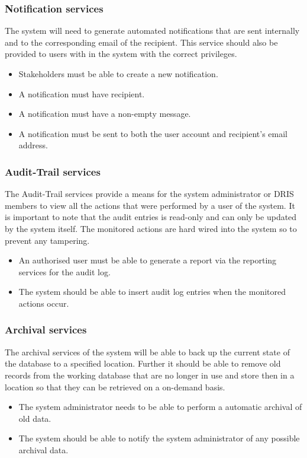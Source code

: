 \documentclass[12pt]{article}
\begin{document}
\subsubsection{Notification services}
The system will need to generate automated notifications that are sent internally and to the corresponding email of the recipient. This service should also be provided to users with in the system with the correct privileges.
\begin{itemize}
	\item Stakeholders must be able to create a new notification.
	\item A notification must have recipient.
	\item A notification must have a non-empty message.
	\item A notification must be sent to both the user account and recipient's email address.
\end{itemize}

\subsubsection{Audit-Trail services}
The Audit-Trail services provide a means for the system administrator or DRIS members to view all the actions that were performed by a user of the system. It is important to note that the audit entries is read-only and can only be updated by the system itself. The monitored actions are hard wired into the system so to prevent any tampering.
\begin{itemize}
	\item An authorised user must be able to generate a report via the reporting services for the audit log.
	\item The system should be able to insert audit log entries when the monitored actions occur.
\end{itemize}
\subsubsection{Archival services}
The archival services of the system will be able to back up the current state of the database to a specified location. Further it should be able to remove old records from the working database that are no longer in use and store then in a location so that they can be retrieved on a on-demand basis.
\begin{itemize}
	\item The system administrator needs to be able to perform a automatic archival of old data.
	\item The system should be able to notify the system administrator of any possible archival data.
\end{itemize}
\vspace{0.2in}
\end{document}
